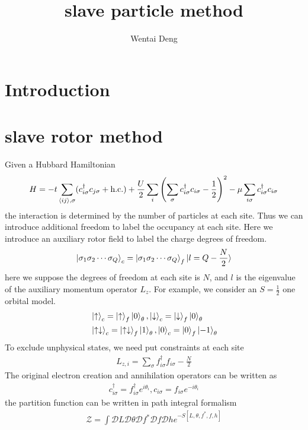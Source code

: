 \documentclass{article}
\title{slave particle method}
\author{Wentai Deng}
\begin{document}
\maketitle
\section{Introduction}
\section{slave rotor method}
Given a Hubbard Hamiltonian
\begin{align*}
    H = -t\sum_{\braket{ij},\sigma}(c_{i\sigma}^{\dagger}c_{j\sigma}+\text{h.c.})+\frac{U}{2}\sum_i\left(\sum_{\sigma}c_{i\sigma}^{\dagger}c_{i\sigma}-\frac{1}{2}\right)^2-\mu\sum_{i\sigma}c_{i\sigma}^{\dagger}c_{i\sigma}
\end{align*}
the interaction is determined by the number of particles at each site. Thus we can introduce additional freedom to label the occupancy at each site. Here we introduce an auxiliary rotor field to label the charge degrees of freedom.
\begin{align*}
    \ket{\sigma_1\sigma_2\cdots\sigma_Q}_c = \ket{\sigma_1\sigma_2\cdots\sigma_Q}_f\ket{l=Q-\frac{N}{2}}
\end{align*}
here we suppose the degrees of freedom at each site is $N$, and $l$ is the eigenvalue of the auxiliary momentum operator $L_z$. For example, we consider an $S=\frac{1}{2}$ one orbital model.
\begin{align*}
    &\ket{\uparrow}_c = \ket{\uparrow}_f\ket{0}_{\theta},\ket{\downarrow}_c = \ket{\downarrow}_f\ket{0}_{\theta} \\
    & \ket{\uparrow\downarrow}_c = \ket{\uparrow\downarrow}_f\ket{1}_{\theta},\ket{0}_c = \ket{0}_f\ket{-1}_{\theta}
\end{align*}
To exclude unphysical states, we need put constraints at each site
\begin{align*}
    L_{z,i} = \sum_{\sigma}f_{i\sigma}^{\dagger}f_{i\sigma}-\frac{N}{2}
\end{align*}
The original electron creation and annihilation operators can be written as
\begin{align*}
    c_{i\sigma}^{\dagger} = f_{i\sigma}^{\dagger}e^{i\theta_i},c_{i\sigma} = f_{i\sigma}e^{-i\theta_i}
\end{align*}
the partition function can be written in path integral formalism
\begin{align*}
    \mathcal{Z} = \int \mathcal{D}L\mathcal{D}\theta\mathcal{D}f^*\mathcal{D}f\mathcal{D}he^{-S[L,\theta,f^*,f,h]}
\end{align*}
\end{document}
